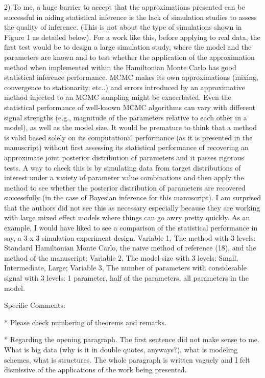 \documentclass[12pt]{article}
\begin{document}
2) To me, a huge barrier to accept that the approximations presented can be successful in aiding statistical inference is the lack of simulation studies to assess the quality of inference. (This is not about the type of simulations shown in Figure 1 as detailed below). For a work like this, before applying to real data, the first test would be to design a large simulation study, where the model and the parameters are known and to test whether the application of the approximation method when implemented within the Hamiltonian Monte Carlo has good statistical inference performance. MCMC makes its own approximations (mixing, convergence to stationarity, etc..) and errors introduced by an approximative method injected to an MCMC sampling might be exacerbated. Even the statistical performance of well-known MCMC algorithms can vary with different signal strengths (e.g., magnitude of the parameters relative to each other in a model), as well as the model size. It would be premature to think that a method is valid based solely on its computational performance (as it is presented in the manuscript) without first assessing its statistical performance of recovering an approximate joint posterior distribution of parameters and it passes rigorous tests. A way to check this is by simulating data from target distributions of interest under a variety of parameter value combinations and then apply the method to see whether the posterior distribution of parameters are recovered successfully (in the case of Bayesian inference for this manuscript). I am surprised that the authors did not see this as necessary especially because they are working with large mixed effect models where things can go awry pretty quickly. As an example, I would have liked to see a comparison of the statistical performance in say, a 3 x 3 simulation experiment design. Variable 1, The method with 3 levels: Standard Hamiltonian Monte Carlo, the naive method of reference (18), and the method of the manuscript; Variable 2, The model size with 3 levels: Small, Intermediate, Large; Variable 3, The number of parameters with considerable signal with 3 levels: 1 parameter, half of the parameters, all parameters in the model. 


Specific Comments: 

* Please check numbering of theorems and remarks. 

* Regarding the opening paragraph. The first sentence did not make sense to me. What is big data (why is it in double quotes, anyways?), what is modeling schemes, what is structures. The whole paragraph is written vaguely and I felt dismissive of the applications of the work being presented. 
\end{document}
